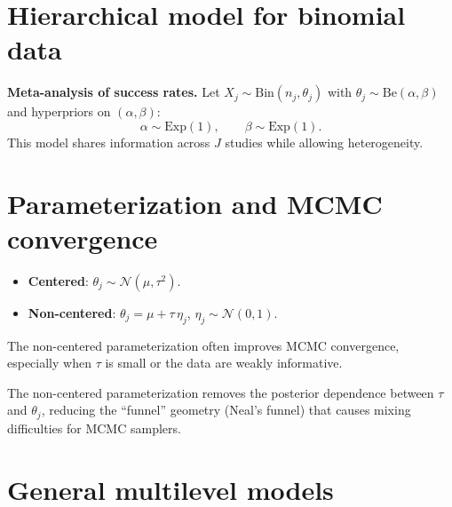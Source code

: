 \section{Hierarchical model for binomial data}

\begin{example}
\textbf{Meta-analysis of success rates.}
Let $X_j \sim \text{Bin}(n_j, \theta_j)$ with
$\theta_j \sim \text{Be}(\alpha, \beta)$ and hyperpriors on
$(\alpha, \beta)$:
\[
  \alpha \sim \text{Exp}(1), \qquad \beta \sim \text{Exp}(1).
\]
This model shares information across $J$ studies while allowing
heterogeneity.
\end{example}

\section{Parameterization and MCMC convergence}

\begin{definition}
\begin{itemize}
  \item \textbf{Centered}: $\theta_j \sim \mathcal{N}(\mu, \tau^2)$.
  \item \textbf{Non-centered}: $\theta_j = \mu + \tau\,\eta_j$,
        $\eta_j \sim \mathcal{N}(0, 1)$.
\end{itemize}
The non-centered parameterization often improves MCMC convergence,
especially when $\tau$ is small or the data are weakly informative.
\end{definition}

\begin{remark}
The non-centered parameterization removes the posterior dependence
between $\tau$ and $\theta_j$, reducing the ``funnel'' geometry
(Neal's funnel) that causes mixing difficulties for MCMC samplers.
\end{remark}

\section{General multilevel models}

